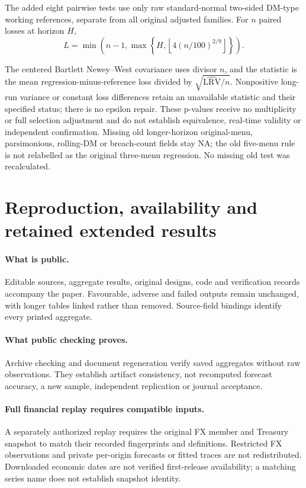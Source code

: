 \documentclass[11pt,a4paper]{article}
\begin{document}
\begin{samepage}
The added eight pairwise tests use only raw standard-normal two-sided
DM-type working references, separate from all original adjusted families.
For \(n\) paired losses at horizon \(H\),
\[
L=\min\!\left(n-1,\max\!\left\{H,
\left\lfloor4(n/100)^{2/9}\right\rfloor\right\}\right).
\]
\end{samepage}
The centered Bartlett Newey--West covariance uses divisor \(n\), and the
statistic is the mean regression-minus-reference loss divided by
\(\sqrt{\widehat{\mathrm{LRV}}/n}\). Nonpositive long-run variance or constant
loss differences retain an unavailable statistic and their specified status;
there is no epsilon repair. These p-values receive no multiplicity or full
selection adjustment and do not establish equivalence, real-time validity or
independent confirmation. Missing old longer-horizon original-menu, parsimonious,
rolling-DM or breach-count fields stay NA; the old five-menu rule is not relabelled
as the original three-menu regression. No missing old test was recalculated.

\section{Reproduction, availability and retained extended results}\label{sup:reproduction}

\paragraph{What is public.}
Editable sources, aggregate results, original designs, code and verification
records accompany the paper. Favourable, adverse and failed outputs remain
unchanged, with longer tables linked rather than removed. Source-field
bindings identify every printed aggregate.

\paragraph{What public checking proves.}
Archive checking and document regeneration verify saved aggregates without raw
observations. They establish artifact consistency, not recomputed forecast
accuracy, a new sample, independent replication or journal acceptance.

\paragraph{Full financial replay requires compatible inputs.}
A separately authorized replay requires the original FX member and Treasury
snapshot to match their recorded fingerprints and definitions. Restricted FX
observations and private per-origin forecasts or fitted traces are not
redistributed. Downloaded economic dates are not verified first-release
availability; a matching series name does not establish snapshot identity.
\end{document}
